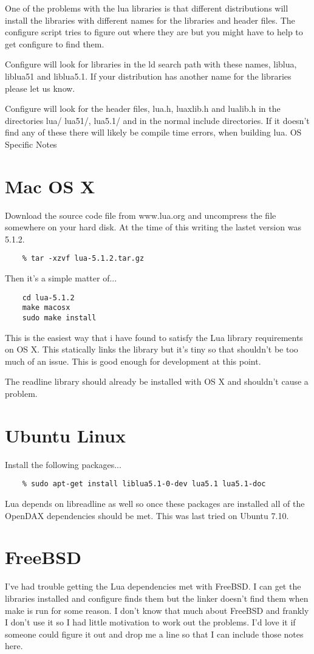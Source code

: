 \documentclass[executivepaper,10pt]{book}
\begin{document}
One of the problems with the lua libraries is that different distributions will install the libraries with different names for the libraries and header files. The configure script tries to figure out where they are but you might have to help to get configure to find them.

Configure will look for libraries in the ld search path with these names, liblua, liblua51 and liblua5.1. If your distribution has another name for the libraries please let us know.

Configure will look for the header files, lua.h, luaxlib.h and lualib.h in the directories lua/ lua51/, lua5.1/ and in the normal include directories. If it doesn't find any of these there will likely be compile time errors, when building lua.
OS Specific Notes
\section*{Mac OS X}
Download the source code file from www.lua.org and uncompress the file somewhere on your hard disk. At the time of this writing the lastet version was 5.1.2.
\begin{verbatim}
    % tar -xzvf lua-5.1.2.tar.gz
\end{verbatim}

Then it's a simple matter of...
\begin{verbatim}
    cd lua-5.1.2
    make macosx
    sudo make install
\end{verbatim}

This is the easiest way that i have found to satisfy the Lua library requirements on OS X. This statically links the library but it's tiny so that shouldn't be too much of an issue. This is good enough for development at this point.

The readline library should already be installed with OS X and shouldn't cause a problem.
\section*{Ubuntu Linux}

Install the following packages...
\begin{verbatim}
    % sudo apt-get install liblua5.1-0-dev lua5.1 lua5.1-doc
\end{verbatim}
Lua depends on libreadline as well so once these packages are installed all of the OpenDAX dependencies should be met. This was last tried on Ubuntu 7.10.
\section*{FreeBSD}

I've had trouble getting the Lua dependencies met with FreeBSD. I can get the libraries installed and configure finds them but the linker doesn't find them when make is run for some reason. I don't know that much about FreeBSD and frankly I don't use it so I had little motivation to work out the problems. I'd love it if someone could figure it out and drop me a line so that I can include those notes here. 
\end{document}
